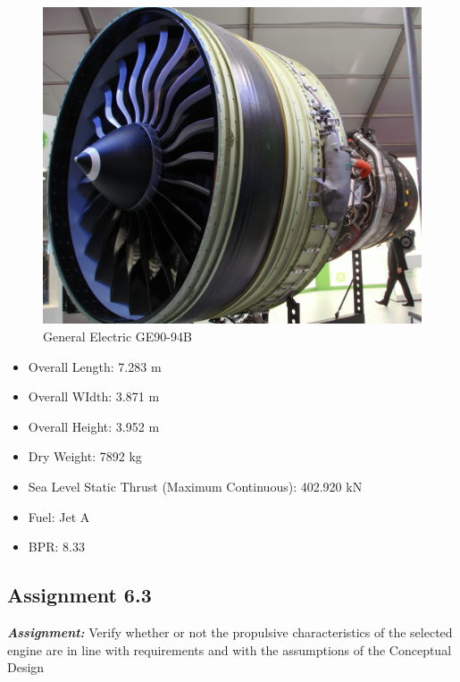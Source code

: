 \documentclass{article}
\begin{document}
\begin{figure}[h!]
    \centering
    \includegraphics[width=\textwidth]{Sources/Plots_and_Pictures/engine.jpeg}
    \caption{General Electric GE90-94B \autocite{ge90}}
    \label{General_electric}
\end{figure}

\begin{itemize}
    \item Overall Length: 7.283 m
    \item Overall WIdth: 3.871 m
    \item Overall Height: 3.952 m
    \item Dry Weight: 7892 kg
    \item Sea Level Static Thrust (Maximum Continuous): 402.920 kN
    \item Fuel: Jet A
    \item BPR: 8.33
\end{itemize}

\clearpage



\subsection{Assignment 6.3\label{Assignment_6.3}}

\textbf{\textit{Assignment:}} Verify whether or not the propulsive characteristics of the selected 
engine are in line with requirements and with the assumptions of the Conceptual Design \\ \\ \\ 
\end{document}

